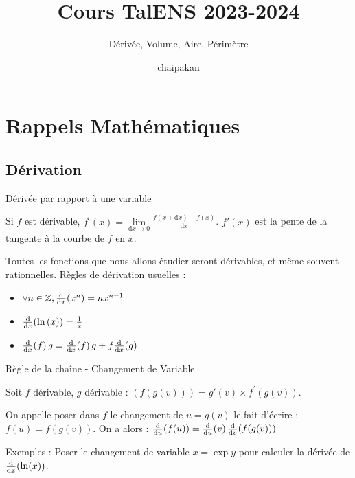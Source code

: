 \documentclass{beamercours}
\title{Cours TalENS 2023-2024}
\subtitle{Dérivée, Volume, Aire, Périmètre}
\date{chaipakan}
\begin{document}
\maketitle

    \section{Rappels Mathématiques}
        \subsection{Dérivation}
            \begin{frame}{Dérivée par rapport à une variable}
                \begin{definition}
                    Si $f$ est dérivable, $f^{'}(x) = \lim\limits_{\mathrm{d}x \rightarrow 0} \frac{f(x + \mathrm{d}x) - f(x)}{\mathrm{d}x}$. $f'(x)$ est la pente de la tangente à la courbe de $f$ en $x$.
                \end{definition}
                Toutes les fonctions que nous allons étudier seront dérivables, et même souvent rationnelles.
                Règles de dérivation usuelles : 
                \begin{itemize}
                    \item $\forall n \in \mathbb{Z},  \frac{\mathrm{d}}{\mathrm{d}x}\!\left(x^{n}\right) = nx^{n-1}$
                    \item $\frac{\mathrm{d}}{\mathrm{d}x}\!\left(\ln{(x)}\right) = \frac{1}{x}$
                    \item $\frac{\mathrm{d}}{\mathrm{d}x}\!\left(f\right)g = \frac{\mathrm{d}}{\mathrm{d}x}\!\left(f\right)g + f\frac{\mathrm{d}}{\mathrm{d}x}\!\left(g\right) $
                \end{itemize}
            \end{frame}
            
            \begin{frame}{Règle de la chaîne - Changement de Variable}
                \begin{theorem}
                    Soit $f$ dérivable, $g$ dérivable : $(f(g(v))) = g'(v) \times f^{'}(g(v))$.
                \end{theorem}
                \begin{definition}
                    On appelle poser dans $f$ le changement de $u = g(v)$ le fait d'écrire : $f(u) = f(g(v))$. On a alors : $\frac{\mathrm{d}}{\mathrm{d}u}\!\left(f(u)\right) = \frac{\mathrm{d}}{\mathrm{d}u}\!\left(v\right)\frac{\mathrm{d}}{\mathrm{d}v}\!\left(f(g(v))\right)$
                \end{definition}
                Exemples : Poser le changement de variable $x = \exp y$ pour calculer la dérivée de $\frac{\mathrm{d}}{\mathrm{d}x}\!\left(\ln(x)\right)$. 
            \end{frame}
\end{document}
